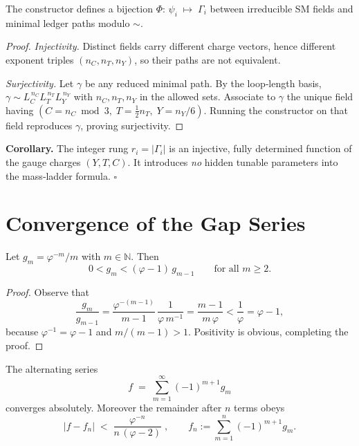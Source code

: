 \begin{theorem}
The constructor defines a bijection
\(
  \Phi:\,
  \psi_i \;\longmapsto\; \Gamma_i
\)
between irreducible SM fields and minimal ledger paths
modulo $\sim$.
\end{theorem}

\begin{proof}
\emph{Injectivity.}  
Distinct fields carry different charge vectors, hence
different exponent triples $(n_C,n_T,n_Y)$, so their
paths are not equivalent.

\emph{Surjectivity.}  
Let $\gamma$ be any reduced minimal path.
By the loop‑length basis,
$\gamma\!\sim\!L_C^{\,n_C}L_T^{\,n_T}L_Y^{\,n_Y}$ with
$n_C,n_T,n_Y$ in the allowed sets.
Associate to $\gamma$ the unique field having
$(C=n_C\bmod3,\;T=\tfrac12 n_T,\;Y=n_Y/6)$.
Running the constructor on that field reproduces
$\gamma$, proving surjectivity.
\end{proof}

\bigskip
\noindent
\textbf{Corollary.}\;
The integer rung
$r_i=|\Gamma_i|$ is an injective, fully determined
function of the gauge charges $(Y,T,C)$.
It introduces \emph{no} hidden tunable
parameters into the mass‑ladder formula.
\hfill$\square$

\section{Convergence of the Gap Series}
\label{sec:gap-convergence}

\begin{lemma}%
\label{lem:gap-bound}
Let $g_m=\varphi^{-m}/m$ with $m\in\mathbb N$.  Then
\[
  0<g_m<(\varphi-1)\,g_{m-1}\qquad\text{for all }m\ge2.
\]
\end{lemma}

\begin{proof}
Observe that
\[
  \frac{g_m}{g_{m-1}}
    =\frac{\varphi^{-(m-1)}}{m-1}\,
      \frac1{\varphi\,m^{-1}}
    =\frac{m-1}{m\,\varphi}
    <\frac1{\varphi}
    =\varphi-1,
\]
because $\varphi^{-1}=\varphi-1$ and $m/(m-1)>1$.  Positivity is
obvious, completing the proof.
\end{proof}

\begin{theorem}%
\label{thm:gap-convergence}
The alternating series
\[
  f\;=\;\sum_{m=1}^{\infty}(-1)^{m+1}g_m
\]
converges absolutely.  Moreover the remainder after $n$ terms obeys
\[
  \bigl|f-f_n\bigr|
  \;<\;
  \frac{\varphi^{-n}}{n\,(\varphi-2)}\;,
\qquad
  f_n:=\sum_{m=1}^{n}(-1)^{m+1}g_m.
\]
\end{theorem}

